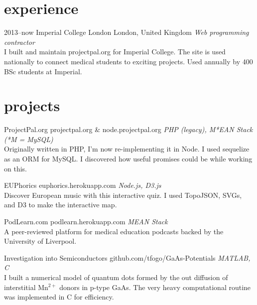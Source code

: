 \documentclass[]{friggeri-cv} %
\begin{document}
\section{\color{red}experience}

\begin{entrylist}
\entry
{2013--now}
{Imperial College London}
{London, United Kingdom}
{\emph{Web programming contractor} \\
I built and maintain projectpal.org for Imperial College. The site is used nationally to connect medical students to exciting projects. Used annually by 400 BSc students at Imperial.}
\end{entrylist}

\section{\color{orange}projects}

\begin{entrylist}
\entry
{}
{ProjectPal.org}
{projectpal.org \& node.projectpal.org}
{\emph{PHP (legacy), M*EAN Stack (*M = MySQL)} \\
Originally written in PHP, I'm now re-implementing it in Node. I used sequelize as an ORM for MySQL. I discovered how useful promises could be while working on this.}
\end{entrylist}

\begin{entrylist}
\entry
{}
{EUPhorics}
{euphorics.herokuapp.com}
{\emph{Node.js, D3.js} \\
Discover European music with this interactive quiz. I used TopoJSON, SVGs, and D3 to make the interactive map.}
\end{entrylist}

\begin{entrylist}
\entry
{}
{PodLearn.com}
{podlearn.herokuapp.com}
{\emph{MEAN Stack} \\
A peer-reviewed platform for medical education podcasts backed by the University of Liverpool.}
\end{entrylist}

\begin{entrylist}
\entry
{}
{Investigation into Semiconductors}
{github.com/tfogo/GaAs-Potentials}
{\emph{MATLAB, C} \\
I built a numerical model of quantum dots formed by the out diffusion of interstitial Mn$^{2+}$ donors in p-type GaAs. The very heavy computational routine was implemented in C for efficiency.}
\end{entrylist}
\end{document}

